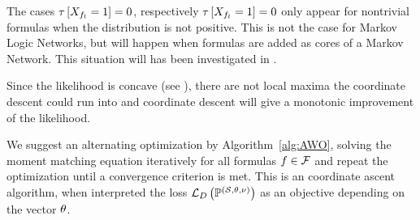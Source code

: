 %
The cases $\tau\left[X_{f_{l}}=1\right]=0$, respectively $\tau\left[X_{f_{l}}=1\right]=0$ only appear for nontrivial formulas when the distribution is not positive.
This is not the case for Markov Logic Networks, but will happen when formulas are added as cores of a Markov Network.
This situation will has been investigated in .


Since the likelihood is concave (see \cite{koller_probabilistic_2009}), there are not local maxima the coordinate descent could run into and coordinate descent will give a monotonic improvement of the likelihood.

We suggest an alternating optimization by Algorithm~\ref{alg:AWO}, solving the moment matching equation iteratively for all formulas $f\in\mathcal{F}$ and repeat the optimization until a convergence criterion is met.
This is an coordinate ascent algorithm, when interpreted the loss $\mathcal{L}_{D}\left(\mathbb{P}^{(\mathcal{S},\theta,\nu)}\right)$ as an objective depending on the vector $\theta$.

